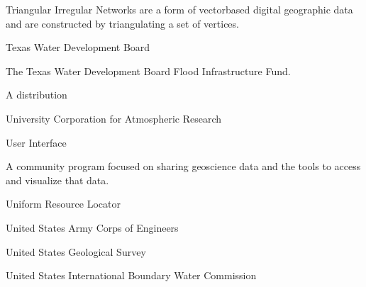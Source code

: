\documentclass[letterpaper,12pt,english,openany,oneside]{sphinxmanual}
\begin{document}
\begin{description}
\sphinxAtStartPar
Triangular Irregular Networks are a form of vector\sphinxhyphen{}based digital geographic data and are constructed by triangulating a set of vertices.

\sphinxAtStartPar
Texas Water Development Board

\sphinxAtStartPar
The Texas Water Development Board Flood Infrastructure Fund.

\sphinxAtStartPar
A {\hyperref[\detokenize{glossary:term-Linux}]{}} distribution

\sphinxAtStartPar
University Corporation for Atmospheric Research

\sphinxAtStartPar
User Interface

\sphinxAtStartPar
A {\hyperref[\detokenize{glossary:term-UCAR}]{}} community program focused on sharing geoscience data and the tools to access and visualize that data.

\sphinxAtStartPar
Uniform Resource Locator

\sphinxAtStartPar
United States Army Corps of Engineers

\sphinxAtStartPar
United States Geological Survey

\sphinxAtStartPar
United States International Boundary Water Commission


\end{description}
\end{document}
